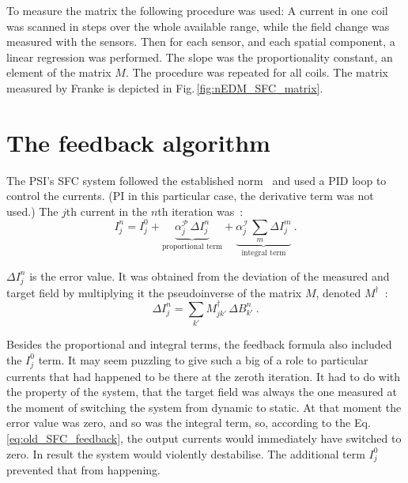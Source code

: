 To measure the matrix the following procedure was used: A current in one coil was scanned in steps over the whole available range, while the field change was measured with the sensors. Then for each sensor, and each spatial component, a linear regression was performed. The slope was the proportionality constant, an element of the matrix $M$. The procedure was repeated for all coils. The matrix measured by Franke is depicted in Fig.\,\ref{fig:nEDM_SFC_matrix}.




\section{The feedback algorithm}
The PSI's SFC system followed the established norm~\cite{Kelha1982,Brake1991,Spemann2003,Brys2005} and used a PID loop to control the currents. (PI in this particular case, the derivative term was not used.) The $j$th current in the $n$th iteration was~\cite{Franke2013}:
\begin{equation}
  \label{eq:old_SFC_feedback}
  I^n_j = I^0_j +
    \underbrace{ \alpha^\mathcal{P}_j \, \Delta I^n_j }_\text{proportional term} +
    \underbrace{ \alpha^\mathcal{I}_j \, \sum_m \Delta I^m_j }_\text{integral term} \ .
\end{equation}

$\Delta I^n_j$ is the error value. It was obtained from the deviation of the measured and target field by multiplying it the pseudoinverse of the matrix $M$, denoted $M^\dagger$~\cite{Franke2013}:
\begin{equation}
  \Delta I^n_j = \sum_{k'} M^\dagger_{jk'} \, \Delta B^n_{k'} \ .
\end{equation}

Besides the proportional and integral terms, the feedback formula also included the $I^0_j$ term. It may seem puzzling to give such a big of a role to particular currents that had happened to be there at the zeroth iteration. It had to do with the property of the system, that the target field was always the one measured at the moment of switching the system from dynamic to static.
At that moment the error value was zero, and so was the integral term, so, according to the Eq.\,\ref{eq:old_SFC_feedback}, the output currents would immediately have switched to zero. In result the system would violently destabilise. The additional term $I^0_j$ prevented that from happening.

